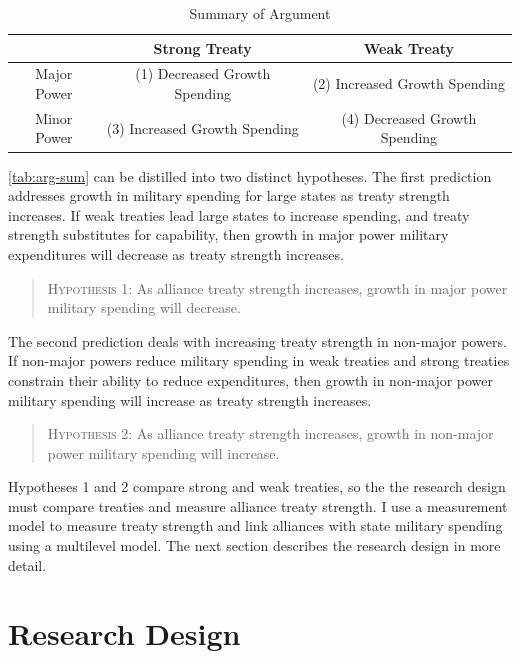 \documentclass[12pt]{article}
\begin{document}
\begin{table}
\begin{center}
\begin{tabular}{ccc}
      & Strong Treaty      & Weak Treaty  \\
\hline
Major Power & (1)  Decreased Growth Spending   & (2)  Increased Growth Spending        \\
\hline
Minor Power & (3) Increased Growth Spending   & (4) Decreased Growth Spending       \\ 
\hline 
\end{tabular}
\end{center}
\caption{Summary of Argument}
\label{tab:arg-sum}
\end{table}


\autoref{tab:arg-sum} can be distilled into two distinct hypotheses. 
The first prediction addresses growth in military spending for large states as treaty strength increases. 
If weak treaties lead large states to increase spending, and treaty strength substitutes for capability, then growth in major power military expenditures will decrease as treaty strength increases. 


\begin{quote}
\textsc{Hypothesis 1}: As alliance treaty strength increases, growth in major power military spending will decrease. 
\end{quote}


The second prediction deals with increasing treaty strength in non-major powers. 
If non-major powers reduce military spending in weak treaties and strong treaties constrain their ability to reduce expenditures, then growth in non-major power military spending will increase as treaty strength increases. 


\begin{quote}
\textsc{Hypothesis 2}: As alliance treaty strength increases, growth in non-major power military spending will increase. 
\end{quote}


Hypotheses 1 and 2 compare strong and weak treaties, so the the research design must compare treaties and measure alliance treaty strength.  
I use a measurement model to measure treaty strength and link alliances with state military spending using a multilevel model. 
The next section describes the research design in more detail. 


\section{Research Design} 
\end{document}
